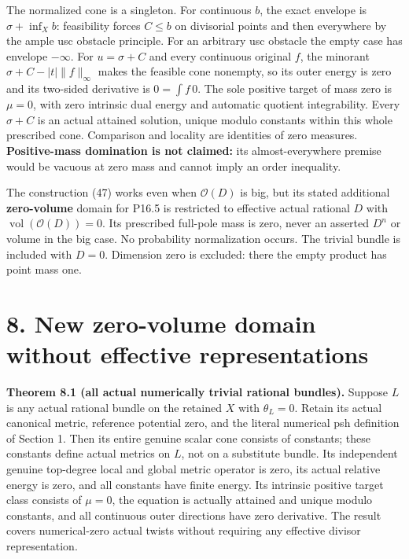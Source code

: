 \documentclass[
  10pt,
]{article}
\begin{document}
The normalized cone is a singleton. For continuous \(b\), the exact
envelope is \(\sigma+\inf_X b\): feasibility forces \(C\leq b\) on
divisorial points and then everywhere by the ample usc obstacle
principle. For an arbitrary usc obstacle the empty case has envelope
\(-\infty\). For \(u=\sigma+C\) and every continuous original \(f\), the
minorant \(\sigma+C-|t|\|f\|_\infty\) makes the feasible cone nonempty,
so its outer energy is zero and its two-sided derivative is
\(0=\int f\,0\). The sole positive target of mass zero is \(\mu=0\),
with zero intrinsic dual energy and automatic quotient integrability.
Every \(\sigma+C\) is an actual attained solution, unique modulo
constants within this whole prescribed cone. Comparison and locality are
identities of zero measures. \textbf{Positive-mass domination is not
claimed:} its almost-everywhere premise would be vacuous at zero mass
and cannot imply an order inequality.

The construction (47) works even when \(\mathcal O(D)\) is big, but its
stated additional \textbf{zero-volume} domain for P16.5 is restricted to
effective actual rational \(D\) with
\(\operatorname{vol}(\mathcal O(D))=0\). Its prescribed full-pole mass
is zero, never an asserted \(D^n\) or volume in the big case. No
probability normalization occurs. The trivial bundle is included with
\(D=0\). Dimension zero is excluded: there the empty product has point
mass one.

\section{8. New zero-volume domain without effective
representations}\label{new-zero-volume-domain-without-effective-representations}

\textbf{Theorem 8.1 (all actual numerically trivial rational bundles).}
Suppose \(L\) is any actual rational bundle on the retained \(X\) with
\(\theta_L=0\). Retain its actual canonical metric, reference potential
zero, and the literal numerical psh definition of Section 1. Then its
entire genuine scalar cone consists of constants; these constants define
actual metrics on \(L\), not on a substitute bundle. Its independent
genuine top-degree local and global metric operator is zero, its actual
relative energy is zero, and all constants have finite energy. Its
intrinsic positive target class consists of \(\mu=0\), the equation is
actually attained and unique modulo constants, and all continuous outer
directions have zero derivative. The result covers numerical-zero actual
twists without requiring any effective divisor representation.
\end{document}
